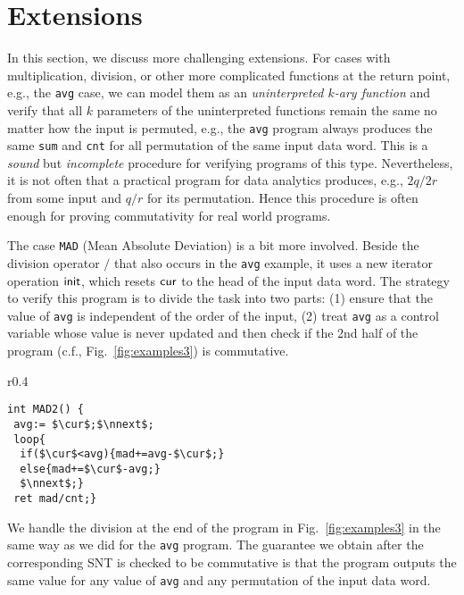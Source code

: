 

\section{Extensions}
\label{sec:cases}



In this section, we discuss more challenging extensions. 
For cases with multiplication, division, or other more complicated functions at the return point, e.g., the \texttt{avg} case, we can model them as an \emph{uninterpreted $k$-ary function} and verify that all $k$ parameters of the uninterpreted functions remain the same no matter how the input is permuted, e.g., the \texttt{avg} program always produces the same \texttt{sum} and \texttt{cnt} for all permutation of the same input data word. This is a \emph{sound} but \emph{incomplete} procedure for verifying programs of this type. Nevertheless, it is not often that a  practical program for data analytics produces, e.g., $2q/2r$ from some input and $q/r$ for its permutation. Hence this procedure is often enough for proving commutativity for real world programs.

The case \texttt{MAD} (Mean Absolute Deviation) is a bit more involved. Beside the division operator $/$ that also occurs in the \texttt{avg} example, it uses a new iterator operation $\mathsf{init}$, which resets $\mathsf{cur}$ to the head of the input data word. The strategy to verify this program is to divide the task into two parts: (1) ensure that the value of \texttt{avg} is independent of the order of the input, (2) treat \texttt{avg} as a control variable whose value is never updated and then check if the 2nd half of the program (c.f., Fig.~\ref{fig:examples3}) is commutative. 

\begin{wrapfigure}{r}{0.4\textwidth}
	\vspace{-0.8cm}
	\lstset{language=C,
		basicstyle=\ttfamily\scriptsize}
	\begin{lstlisting}[mathescape=true]
int MAD2() {
 avg:= $\cur$;$\nnext$;
 loop{
  if($\cur$<avg){mad+=avg-$\cur$;}
  else{mad+=$\cur$-avg;}
  $\nnext$;}
 ret mad/cnt;}
	\end{lstlisting}	
	\vspace{-0.4cm}
	\caption{The 2nd half of MAD}
	\label{fig:examples3}
	\vspace{-0.7cm}
\end{wrapfigure}
We handle the division at the end of the program in Fig.~\ref{fig:examples3} in the same way as we did for the \texttt{avg} program. The guarantee we obtain after the corresponding SNT is checked to be commutative is that the program outputs the same value for any value of \texttt{avg} and any permutation of  the input data word. 


